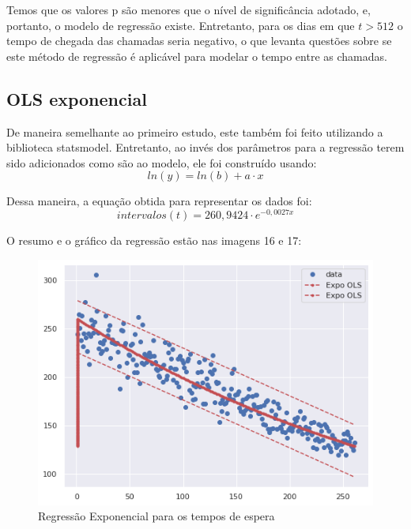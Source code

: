 Temos que os valores p são menores que o nível de significância adotado, e, portanto, o modelo de regressão existe. Entretanto, para os dias em que $t > 512$ o tempo de chegada das chamadas seria negativo, o que levanta questões sobre se este método de regressão é aplicável para modelar o tempo entre as chamadas.

\subsection{OLS exponencial}

De maneira semelhante ao primeiro estudo, este também foi feito utilizando a biblioteca statsmodel. Entretanto, ao invés dos parâmetros para a regressão terem sido adicionados como são ao modelo, ele foi construído usando: $$ln(y) = ln(b) + a \cdot x$$

Dessa maneira, a equação obtida para representar os dados foi:
$$intervalos(t) = 260,9424 \cdot e^{-0,0027x} $$

O resumo e o gráfico da regressão estão nas imagens 16 e 17:
\begin{figure}[H]
    \includegraphics{analise-de-dados/regressao/regressao_EXPO.png}
    \caption{Regressão Exponencial para os tempos de espera}
    \label{fig: plot_Expo_OLS}
\end{figure}

